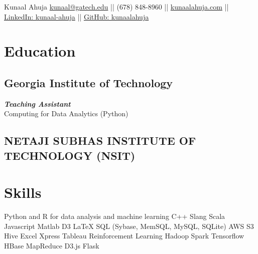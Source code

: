 \documentclass[]{resume-openfont}
\begin{document}
%
%
\namesection{}
{Kunaal Ahuja}{
\href{mailto:kunaal@gatech.edu}{kunaal@gatech.edu} || 
(678) 848-8960 ||
\href{http://www.kunaalahuja.com/}{kunaalahuja.com} ||
\href{https://www.linkedin.com/in/kunaal-ahuja/}{LinkedIn: kunaal-ahuja} ||  
\href{https://github.com/kunaalahuja/}{GitHub: kunaalahuja} \\
}
%
%

\begin{minipage}[t]{0.33\textwidth} 


\section{Education} 

\subsection{Georgia Institute of Technology}
{\footnotesize \textit{\textbf{Teaching Assistant}}} \\
Computing for Data Analytics (Python)\\

\sectionsep

\subsection{NETAJI SUBHAS INSTITUTE OF TECHNOLOGY (NSIT)}
\sectionsep


\section{Skills}
Python and R for data analysis and machine learning \textbullet{}   C++ \textbullet{} Slang \textbullet{} Scala \\
Javascript \textbullet{} Matlab \textbullet{} D3 \textbullet{} \LaTeX  
\vspace{6pt}
SQL (Sybase, MemSQL, MySQL, SQLite) \textbullet{} AWS S3 \textbullet{} Hive \textbullet{} Excel \textbullet{} Xpress \textbullet{} Tableau\vspace{6pt}
Reinforcement Learning   \textbullet{} Hadoop \textbullet{} Spark \textbullet{} Tensorflow \textbullet{} HBase \textbullet{} MapReduce \textbullet{} D3.js \textbullet{} Flask
\sectionsep


\end{minipage}
\end{document}
